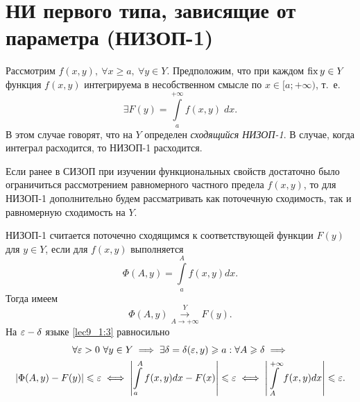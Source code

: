 \documentclass[../../main.tex]{subfiles}
\begin{document}
\section{НИ первого типа, зависящие от параметра (\mbox{НИЗОП-1})}

Рассмотрим $ f(x, y),\ \forall x \geq a,\ \forall y \in Y $.
Предположим, что при каждом $ \operatorname{fix} y \in Y $ функция $ f(x, y) $
интегрируема в несобственном смысле по $ x \in [a; +\infty) $, т.~е.
\begin{equation}
\label{lec9_1:1}
\exists F(y) = \int\limits_a^{+\infty} f(x, y)\; dx.
\end{equation}
В этом случае говорят, что на $ Y $ определен \emph{сходящийся НИЗОП-1}.
В случае, когда интеграл расходится, то НИЗОП-1 расходится.

Если ранее в СИЗОП при изучении функциональных свойств достаточно
было ограничиться рассмотрением равномерного частного предела $ f(x, y) $,
то для НИЗОП-1 дополнительно будем рассматривать как поточечную сходимость,
так и равномерную сходимость на $ Y $.

НИЗОП-1 считается поточечно сходящимся к соответствующей функции $ F(y) $
для ${y \in Y}$, если для $ f(x, y) $ выполняется
\begin{equation}
\label{lec9_1:2}
\Phi(A, y) = \int\limits_a^A f(x, y) dx.
\end{equation}
Тогда имеем
\begin{equation}
\label{lec9_1:3}
\Phi(A, y) \stackrel{Y}{\underset{A \to +\infty}{\to}} F(y).
\end{equation}
На $ \varepsilon-\delta $ языке \eqref{lec9_1:3} равносильно
\begin{equation}
\label{lec9_1:4}
\begin{gathered}
\forall \varepsilon > 0\ \forall y \in Y \implies \exists \delta = \delta(\varepsilon, y)
\geqslant a:\forall A \geqslant \delta \implies\\ 
|\Phi(A, y) - F(y)| \leqslant \varepsilon \iff
\left|\int\limits_a^A f(x, y) dx - F(x)\right| \leqslant \varepsilon \iff
\left|\int\limits_A^{+\infty} f(x, y) dx\right| \leqslant \varepsilon.
\end{gathered}
\end{equation}
\end{document}
